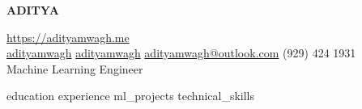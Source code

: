 \documentclass[a4paper, 10pt]{article}
\begin{document}
\begin{center}
	\vspace*{-10pt}
	\begin{center}
		\uppercase{\Huge \bfseries Aditya }
	\end{center}
	\vspace{4pt}
	\href{https://adityamwagh.me}{https://adityamwagh.me} \\

	\vspace{4pt}
	\faLinkedin\space{} \href{https://linkedin.com/in/adityamwagh}{adityamwagh} \space{}
	\faGithub{} \space{} \href{https://github.com/adityamwagh}{adityamwagh} \space{}
	\faAt{} \space{} \href{mailto:adityamwagh@outlook.com}{adityamwagh@outlook.com} \space{}
	\faPhone{} \space{} (929) 424 1931 \\

	\vspace{8pt}
	Machine Learning Engineer
\end{center}

\justifying{}
{education}
{experience}
{ml_projects}
{technical_skills}

\end{document}
